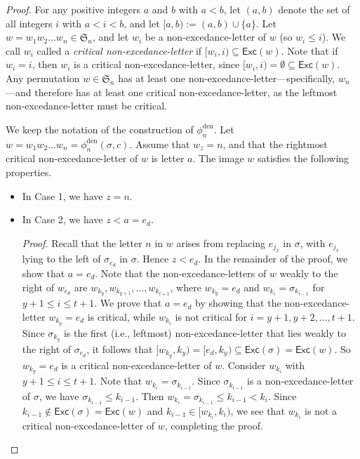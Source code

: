 \documentclass[12pt]{article}
\begin{document}
\begin{proof}
For any positive integers $a$ and $b$ with $a<b$, 
let $(a,b)$ denote the set of all integers $i$ with $a<i<b$, and let $[a, b):=(a, b)\cup\{a\}$.
Let $w=w_{1}w_{2}\ldots w_{n}\in\mathfrak{S}_{n}$,
and let $w_{i}$ be a non-excedance-letter of $w$ 
(so $w_{i}\leq i$).
We call $w_{i}$ called a 
\emph{critical non-excedance-letter} if $[w_{i},i)\subseteq \textsf{Exc}(w)$.
Note that if $w_{i}=i$, then $w_{i}$ is a critical non-excedance-letter,
since $[w_{i},i)=\emptyset\subseteq \textsf{Exc}(w)$.
Any permutation $w\in\mathfrak{S}_{n}$ has at least one non-excedance-letter---specifically, $w_{n}$---and therefore has at least one critical non-excedance-letter, 
as the leftmost non-excedance-letter must be critical.

We keep the notation of the construction of $\phi_{n}^{\text{den}}$.
Let $w=w_{1}w_{2}\ldots w_{n}=\phi_{n}^{\text{den}}(\sigma,c)$. 
Assume that $w_{z}=n$, and that the rightmost critical non-excedance-letter of $w$ is letter $a$.
The image $w$ satisfies the following properties.

\begin{itemize}
\item[$\bullet$] In Case 1, we have $z=n$.

\item[$\bullet$] In Case 2, we have $z<a=e_{d}$.

\emph{Proof.} 
Recall that the letter $n$ in $w$ arises from replacing  $e_{j_{x}}$ in $\sigma$, 
with $e_{j_{x}}$ lying to the left of $\sigma_{e_{d}}$ in $\sigma$.
Hence $z<e_{d}$. 
In the remainder of the proof, we show that $a=e_{d}$.
Note that the non-excedance-letters of $w$ weakly to the right  of  $w_{e_{d}}$ are $w_{k_{y}},w_{k_{y+1}},\ldots,w_{k_{t+1}}$,
where $w_{k_{y}}=e_{d}$ and $w_{k_{i}}=\sigma_{k_{i-1}}$ for $y+1\leq i\leq t+1$.
We prove that $a=e_{d}$ by showing that the non-excedance-letter $w_{k_{y}}=e_{d}$ is critical, while $w_{k_{i}}$ is not critical for $i=y+1,y+2,\ldots,t+1$.
Since $\sigma_{k_{y}}$ is the first (i.e., leftmost) non-excedance-letter that lies weakly to the right of $\sigma_{e_{d}}$,
it follows that $[w_{k_{y}},k_{y})=[e_{d},k_{y})\subseteq\textsf{Exc}(\sigma)=\textsf{Exc}(w)$.
So $w_{k_{y}}=e_{d}$ is a critical non-excedance-letter of $w$.
Consider $w_{k_{i}}$ with $y+1\leq i\leq t+1$.
Note that $w_{k_{i}}=\sigma_{k_{i-1}}$.
Since $\sigma_{k_{i-1}}$ is a non-excedance-letter of $\sigma$,
we have $\sigma_{k_{i-1}}\leq k_{i-1}$.
Then $w_{k_{i}}=\sigma_{k_{i-1}}\leq k_{i-1}<k_{i}$.
Since $k_{i-1}\notin\textsf{Exc}(\sigma)=\textsf{Exc}(w)$ and $k_{i-1}\in[w_{k_{i}},k_{i})$,
we see that $w_{k_{i}}$ is not a critical non-excedance-letter of $w$,
completing the proof.


\end{itemize}
\end{proof}
\end{document}
